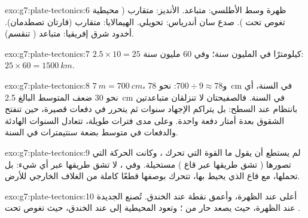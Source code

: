 \begin{solution}{exo:g7:plate-tectonics:6}
ظهرة وسط الأطلسي: متباعد. الأنديز: متقارب ( محيطية تغوص
تحت ). صدع سان أندرياس: تحويلي. الهيمالايا: متقارب (قارتان
تصطدمان). أخدود شرق إفريقيا: متباعد ( تنقسم).
\end{solution}

\begin{solution}{exo:g7:plate-tectonics:7}
$2.5 \times 10 = 25$ كيلومترًا في المليون سنة؛ وفي 60 مليون سنة:
$25 \times 60 = \qty{1500}{km}$.
\end{solution}

\begin{solution}{exo:g7:plate-tectonics:8}
$\qty{7}{m} = \qty{700}{cm}$، و$700 \div 9 \approx 78$: نحو
\qty{78}{cm} في السنة، أي نحو 30 ضعف المتوسط البالغ \qty{2.5}{cm} في السنة.
فالصفيحتان لا تنزلقان متباعدتين بانتظام عند السطح: بل يتراكم الإجهاد
سنوات ثم يتحرر في دفعات قصيرة، حين تنفتح الشقوق بعدة أمتار
دفعة واحدة. وعلى مدى فترات طويلة، تتعادل السنوات الهادئة والدفعات في متوسط بضعة
سنتيمترات في السنة.
\end{solution}

\begin{solution}{exo:g7:plate-tectonics:9}
لم يستطع أن يقول ما القوة التي تحرك ، وكانت الحركة التي
تصورها ( تشق طريقها عبر قاع ) مستحيلة.
وفي ، لا تشق  طريقها عبر أي شيء: بل
تحملها، مع قاع  الذي يحيط بها،  تتحرك بوصفها قطعًا كاملة
من الغلاف الخارجي للأرض.
\end{solution}

\begin{solution}{exo:g7:plate-tectonics:10}
أعلى  عند الظهرة، وأعمق نقطة عند الخندق. تُصنع  الجديدة عند
الظهرة، حيث يصعد  حار من ؛ وتعود  المحيطية إلى
 عند الخندق، حيث تغوص تحت .
\end{solution}

